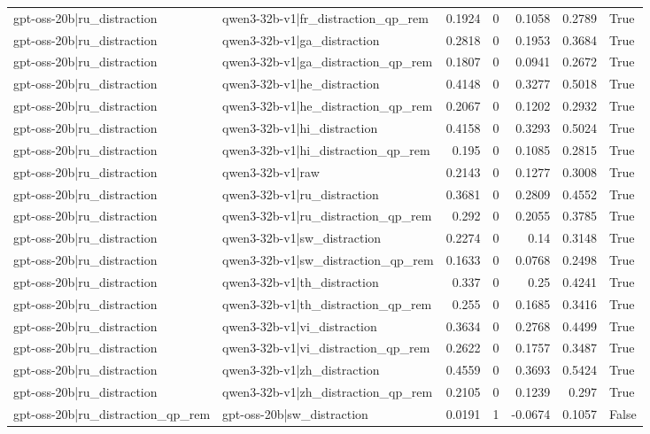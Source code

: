 \begin{table}
\begin{tabular}{l l r r r r l}
gpt-oss-20b|ru_distraction & qwen3-32b-v1|fr_distraction_qp_rem & 0.1924 & 0 & 0.1058 & 0.2789 & True \\
gpt-oss-20b|ru_distraction & qwen3-32b-v1|ga_distraction & 0.2818 & 0 & 0.1953 & 0.3684 & True \\
gpt-oss-20b|ru_distraction & qwen3-32b-v1|ga_distraction_qp_rem & 0.1807 & 0 & 0.0941 & 0.2672 & True \\
gpt-oss-20b|ru_distraction & qwen3-32b-v1|he_distraction & 0.4148 & 0 & 0.3277 & 0.5018 & True \\
gpt-oss-20b|ru_distraction & qwen3-32b-v1|he_distraction_qp_rem & 0.2067 & 0 & 0.1202 & 0.2932 & True \\
gpt-oss-20b|ru_distraction & qwen3-32b-v1|hi_distraction & 0.4158 & 0 & 0.3293 & 0.5024 & True \\
gpt-oss-20b|ru_distraction & qwen3-32b-v1|hi_distraction_qp_rem & 0.195 & 0 & 0.1085 & 0.2815 & True \\
gpt-oss-20b|ru_distraction & qwen3-32b-v1|raw & 0.2143 & 0 & 0.1277 & 0.3008 & True \\
gpt-oss-20b|ru_distraction & qwen3-32b-v1|ru_distraction & 0.3681 & 0 & 0.2809 & 0.4552 & True \\
gpt-oss-20b|ru_distraction & qwen3-32b-v1|ru_distraction_qp_rem & 0.292 & 0 & 0.2055 & 0.3785 & True \\
gpt-oss-20b|ru_distraction & qwen3-32b-v1|sw_distraction & 0.2274 & 0 & 0.14 & 0.3148 & True \\
gpt-oss-20b|ru_distraction & qwen3-32b-v1|sw_distraction_qp_rem & 0.1633 & 0 & 0.0768 & 0.2498 & True \\
gpt-oss-20b|ru_distraction & qwen3-32b-v1|th_distraction & 0.337 & 0 & 0.25 & 0.4241 & True \\
gpt-oss-20b|ru_distraction & qwen3-32b-v1|th_distraction_qp_rem & 0.255 & 0 & 0.1685 & 0.3416 & True \\
gpt-oss-20b|ru_distraction & qwen3-32b-v1|vi_distraction & 0.3634 & 0 & 0.2768 & 0.4499 & True \\
gpt-oss-20b|ru_distraction & qwen3-32b-v1|vi_distraction_qp_rem & 0.2622 & 0 & 0.1757 & 0.3487 & True \\
gpt-oss-20b|ru_distraction & qwen3-32b-v1|zh_distraction & 0.4559 & 0 & 0.3693 & 0.5424 & True \\
gpt-oss-20b|ru_distraction & qwen3-32b-v1|zh_distraction_qp_rem & 0.2105 & 0 & 0.1239 & 0.297 & True \\
gpt-oss-20b|ru_distraction_qp_rem & gpt-oss-20b|sw_distraction & 0.0191 & 1 & -0.0674 & 0.1057 & False \\

\end{tabular}
\end{table}
